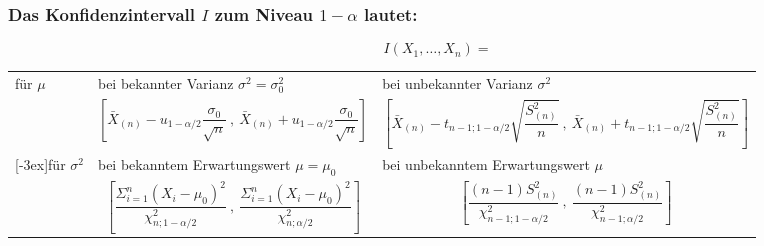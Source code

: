 \documentclass[
ngerman,
accentcolor=9c,%
type=intern,
marginpar=false
]{tudapub}
\begin{document}
            \subsubsection*{Das Konfidenzintervall $I$ zum Niveau $1-\alpha$ lautet:}
            \begin{equation*}
                I(X_1,\dots,X_n)=
            \end{equation*}
            \begin{center}
                {\makegapedcells\begin{tabular}{|l|l|l|}
                    \hline
                    \multirow{2}{*}[-3.5ex]{für $\mu$}& bei bekannter Varianz $\sigma^2 = \sigma_0^2$ & bei unbekannter Varianz $\sigma^2$\\
                    \cline{2-3}
                    &
                    \begin{equation*}
                        \left[
                        \bar{X}_{(n)}-u_{1-\alpha/2}\dfrac{\sigma_0}{\sqrt{n}}
                        \ ,\
                        \bar{X}_{(n)}+u_{1-\alpha/2}\dfrac{\sigma_0}{\sqrt{n}}
                        \right]
                    \end{equation*}
                    &
                    \begin{equation*}
                        \left[
                        \bar{X}_{(n)}-t_{n-1;1-\alpha/2}\sqrt{\dfrac{S^2_{(n)}}{n}}
                        \ ,\
                        \bar{X}_{(n)}+t_{n-1;1-\alpha/2}\sqrt{\dfrac{S^2_{(n)}}{n}}
                        \right]
                    \end{equation*}
                    \\
                    \hline \noalign{\bigskip} \hline
                    \multirow{2}{*}[-3ex]{für $\sigma^2$} & bei bekanntem Erwartungswert $\mu = \mu_0$ & bei unbekanntem Erwartungswert $\mu$\\
                    \cline{2-3}
                    &
                    \begin{equation*}
                        \left[
                        \dfrac{\Sigma_{i=1}^n (X_i-\mu_0)^2}{\chi^2_{n;1-\alpha/2}}
                        \ ,\
                        \dfrac{\Sigma_{i=1}^n (X_i-\mu_0)^2}{\chi^2_{n;\alpha/2}}
                        \right]
                    \end{equation*}
                    &
                    \begin{equation*}
                        \left[
                        \dfrac{(n-1)S^2_{(n)}}{\chi^2_{n-1;1-\alpha/2}}
                        \ ,\
                        \dfrac{(n-1)S^2_{(n)}}{\chi^2_{n-1;\alpha/2}}
                        \right]
                    \end{equation*}
                    \\
                    \hline
                \end{tabular}\label{tab:Konfidenzintervallberechnung}}
            \end{center}
\end{document}
